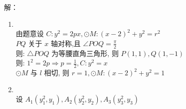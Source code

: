 \documentclass[class=ctexart,crop=false]{standalone}
\begin{document}
解：
\begin{enumerate}[label=(\arabic*)]
      \item \quad\\
            由题意设 $C:y^2=2px,\odot M:(x-2)^2+y^2=r^2$\\
            $PQ$ 关于 $x$ 轴对称,且 $\angle POQ=\frac{\pi}{2}$\\
            则: $\triangle POQ$ 为等腰直角三角形, 则 $P(1,1),Q(1,-1)$\\
            则: $1^2=2p\Rightarrow p=\frac{1}{2},C:y^2=x$\\
            $\odot M$ 与 $l$ 相切, 则 $r=1,\odot M:(x-2)^2+y^2=1$
      \item \quad\\
            设 $A_1(y_1^2,y_1),A_2(y_2^2,y_2),A_3(y_3^2,y_3)$\\

\end{enumerate}
\end{document}
